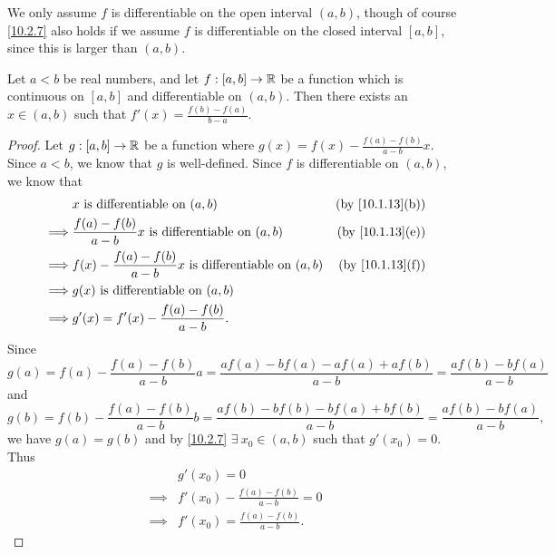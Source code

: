 \begin{rmk}\label{10.2.8}
  We only assume \(f\) is differentiable on the open interval \((a, b)\), though of course \cref{10.2.7} also holds if we assume \(f\) is differentiable on the closed interval \([a, b]\), since this is larger than \((a, b)\).
\end{rmk}

\begin{cor}\label{10.2.9}
  Let \(a < b\) be real numbers, and let \(f : [a, b] \to \mathbb{R}\) be a function which is continuous on \([a, b]\) and differentiable on \((a, b)\).
  Then there exists an \(x \in (a, b)\) such that \(f'(x) = \frac{f(b) - f(a)}{b - a}\).
\end{cor}

\begin{proof}
  Let \(g : [a, b] \to \mathbb{R}\) be a function where \(g(x) = f(x) - \frac{f(a) - f(b)}{a - b} x\).
  Since \(a < b\), we know that \(g\) is well-defined.
  Since \(f\) is differentiable on \((a, b)\), we know that
  \begin{align*}
             & x \text{ is differentiable on } (a, b)                                  & \text{(by \cref{10.1.13}(b))} \\
    \implies & \frac{f(a) - f(b)}{a - b} x \text{ is differentiable on } (a, b)        & \text{(by \cref{10.1.13}(e))} \\
    \implies & f(x) - \frac{f(a) - f(b)}{a - b} x \text{ is differentiable on } (a, b) & \text{(by \cref{10.1.13}(f))} \\
    \implies & g(x) \text{ is differentiable on } (a, b)                                                               \\
    \implies & g'(x) = f'(x) - \frac{f(a) - f(b)}{a - b}.
  \end{align*}
  Since
  \[
    g(a) = f(a) - \frac{f(a) - f(b)}{a - b} a = \frac{af(a) - bf(a) - af(a) + af(b)}{a - b} = \frac{af(b) - bf(a)}{a - b}
  \]
  and
  \[
    g(b) = f(b) - \frac{f(a) - f(b)}{a - b} b = \frac{af(b) - bf(b) - bf(a) + bf(b)}{a - b} = \frac{af(b) - bf(a)}{a - b},
  \]
  we have \(g(a) = g(b)\) and by \cref{10.2.7} \(\exists\ x_0 \in (a, b)\) such that \(g'(x_0) = 0\).
  Thus
  \begin{align*}
             & g'(x_0) = 0                             \\
    \implies & f'(x_0) - \frac{f(a) - f(b)}{a - b} = 0 \\
    \implies & f'(x_0) = \frac{f(a) - f(b)}{a - b}.
  \end{align*}
\end{proof}

